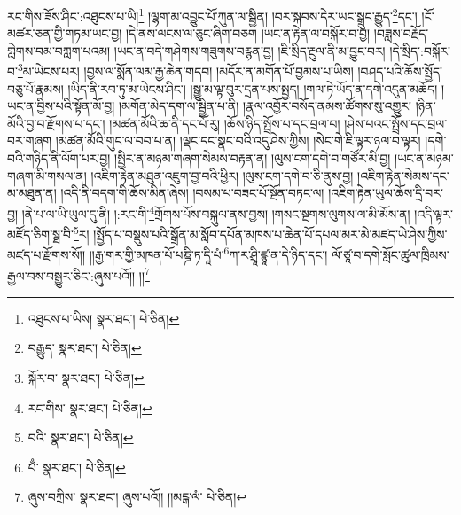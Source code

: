 རང་གིས་ཟོས་ཤིང་:འཐུངས་པ་ཡི།\footnote{འཐུངས་པ་ཡིས།  སྣར་ཐང་།  པེ་ཅིན། } །ལྷག་མ་འབྱུང་པོ་ཀུན་ལ་སྦྱིན། །བར་སྐབས་དེར་ཡང་སྒྲུང་རྒྱུད་\footnote{བརྒྱུད་  སྣར་ཐང་།  པེ་ཅིན། }དང་། །ངོ་མཚར་ཅན་གྱི་གཏམ་ཡང་བྱ། །དེ་ནས་ལངས་ལ་ཅུང་ཞིག་བཅག །ཡང་ན་རྟེན་ལ་བསྐོར་བ་བྱ། །བཟླས་བརྗོད་གླེགས་བམ་བཀླག་པའམ། །ཡང་ན་བདེ་གཤེགས་གཟུགས་བརྙན་བྱ། །ཇི་སྲིད་རྔུལ་ནི་མ་བྱུང་བར། །དེ་སྲིད་:བསྐོར་བ་\footnote{སྐོར་བ་  སྣར་ཐང་།  པེ་ཅིན། }མ་ཡེངས་པར། །བྱས་ལ་སྨོན་ལམ་རྒྱ་ཆེན་གདབ། །མདོར་ན་མགོན་པོ་བྱམས་པ་ཡིས། །བཤད་པའི་ཆོས་སྤྱོད་བཅུ་པོ་རྣམས། །ཡིད་ནི་རབ་ཏུ་མ་ཡེངས་ཤིང་། །སྒྱུ་མ་ལྟ་བུར་དྲན་པས་སྤྱད། །གལ་ཏེ་ཡོད་ན་དགེ་འདུན་མཆོད། །ཡང་ན་བྱིས་པའི་སྟོན་མོ་བྱ། །མགོན་མེད་དག་ལ་སྦྱིན་པ་ནི། །རྣལ་འབྱོར་བསོད་ནམས་ཚོགས་སུ་འགྱུར། །ཉིན་མོའི་བྱ་བ་རྫོགས་པ་དང་། །མཚན་མོའི་ཆ་ནི་དང་པོ་རུ། །ཆོས་ཉིད་སྤྲོས་པ་དང་བྲལ་བ། །ཤེས་པའང་སྤྲོས་དང་བྲལ་བར་གཞག །མཚན་མོའི་གུང་ལ་བབ་པ་ན། །ལྡང་དང་སྣང་བའི་འདུ་ཤེས་ཀྱིས། །སེང་གེ་ཇི་ལྟར་ཉལ་བ་ལྟར། །དགེ་བའི་གཉིད་ནི་ལོག་པར་བྱ། །སྤྱིར་ན་མཉམ་གཞག་སེམས་བརྟན་ན། །ལུས་ངག་དགེ་བ་གཙོར་མི་བྱ། །ཡང་ན་མཉམ་གཞག་མི་གསལ་ན། །འཇིག་རྟེན་མཐུན་འཇུག་བྱ་བའི་ཕྱིར། །ལུས་ངག་དགེ་བ་ཅི་ནུས་བྱ། །འཇིག་རྟེན་སེམས་དང་མ་མཐུན་ན། །འདི་ནི་བདག་གི་ཆོས་མིན་ཞེས། །བསམ་པ་བཟང་པོ་སྔོན་བཏང་ལ། །འཇིག་རྟེན་ཡུལ་ཆོས་དྲི་བར་བྱ། །ནེ་པ་ལ་ཡི་ཡུལ་དུ་ནི། །:རང་གི་\footnote{རང་གིས་  སྣར་ཐང་།  པེ་ཅིན། }གྲོགས་པོས་བསྐུལ་ནས་བྱས། །གསང་སྔགས་ལུགས་ལ་མི་མོས་ན། །འདི་ལྟར་མཛོད་ཅིག་སྠ་བི་\footnote{བའི་  སྣར་ཐང་།  པེ་ཅིན། }ར། །སྤྱོད་པ་བསྡུས་པའི་སྒྲོན་མ་སློབ་དཔོན་མཁས་པ་ཆེན་པོ་དཔལ་མར་མེ་མཛད་ཡེ་ཤེས་ཀྱིས་མཛད་པ་རྫོགས་སོ།། །།རྒྱ་གར་གྱི་མཁན་པོ་པཎྜི་ཏ་དཱི་པཾ་\footnote{པྃ་  སྣར་ཐང་།  པེ་ཅིན། }ཀ་ར་ཤྲཱི་ཛྙཱ་ན་དེ་ཉིད་དང་། ལོ་ཙཱ་བ་དགེ་སློང་ཚུལ་ཁྲིམས་རྒྱལ་བས་བསྒྱུར་ཅིང་:ཞུས་པའོ།། །།\footnote{ཞུས་བཀྲིས་  སྣར་ཐང་། ཞུས་པའོ།། །།མངྒ་ལཾ་  པེ་ཅིན། }